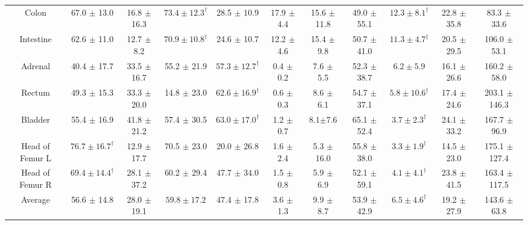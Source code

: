 \begin{table}[t!]
{\begin{subtable}{1\textwidth}
{\begin{tabular}{@{}ccccccccccc@{}}
Colon&67.0 $\pm$ 13.0&16.8 $\pm$ 16.3&$\bm{73.4\pm12.3}^\dagger$&28.5 $\pm$ 10.9&17.9 $\pm$ 4.4&15.6 $\pm$ 11.8&49.0  $\pm$  55.1&$\bm{12.3 \pm 8.1}^\dagger$&22.8 $\pm$ 35.8&83.3 $\pm$ 33.6\\
Intestine&62.6 $\pm$ 11.0&12.7 $\pm$ 8.2&$\bm{70.9\pm10.8}^\dagger$&24.6 $\pm$ 10.7&12.2 $\pm$ 4.6&15.4 $\pm$ 9.8&50.7  $\pm$  41.0& $\bm{11.3 \pm 4.7}^\dagger$ &20.5 $\pm$ 29.5&106.0 $\pm$ 53.1\\
Adrenal&40.4 $\pm$ 17.7&33.5 $\pm$ 16.7&55.2 $\pm$ 21.9&$\bm{57.3\pm12.7}^\dagger$&0.4 $\pm$ 0.2&7.6 $\pm$ 5.5&52.3  $\pm$  38.7& $\bm{6.2 \pm 5.9}$ &16.1 $\pm$ 26.6&160.2 $\pm$ 58.0\\
Rectum&49.3 $\pm$ 15.3&33.3 $\pm$ 20.0&14.8 $\pm$ 23.0&$\bm{62.6\pm16.9}^\dagger$&0.6 $\pm$ 0.3&8.6 $\pm$ 6.1&54.7  $\pm$  37.1& $\bm{5.8 \pm 10.6}^\dagger$ &17.4 $\pm$ 24.6&203.1 $\pm$ 146.3\\
Bladder&55.4 $\pm$ 16.9&41.8 $\pm$ 21.2&57.4 $\pm$ 30.5&$\bm{63.0\pm17.0}^\dagger$&1.2 $\pm$ 0.7&8.1$\pm$7.6&65.1  $\pm$  52.4& $\bm{3.7 \pm 2.3}^\dagger$ &24.1 $\pm$ 33.2&167.7 $\pm$ 96.9\\
Head of Femur L&$\bm{76.7\pm16.7}^\dagger$&12.9 $\pm$ 17.7&70.5 $\pm$ 23.0&20.0 $\pm$ 26.8&1.6 $\pm$ 2.4&5.3 $\pm$ 16.0&55.8  $\pm$  38.0& $\bm{3.3 \pm 1.9}^\dagger$&14.5 $\pm$ 23.0&175.1 $\pm$ 127.4\\
Head of Femur R&$\bm{69.4\pm14.4}^\dagger$&28.1 $\pm$ 37.2&60.2 $\pm$ 29.4&47.7 $\pm$ 34.0&1.5 $\pm$ 0.8&5.9 $\pm$ 6.9&52.1  $\pm$  59.1& $\bm{4.1 \pm 4.1}^\dagger$ &23.8 $\pm$ 41.5&163.4 $\pm$ 117.5\\ \hline
Average&56.6 $\pm$ 14.8&28.0 $\pm$ 19.1&$\bm{59.8\pm17.2}$&47.4 $\pm$ 17.8&3.6 $\pm$ 1.3&9.9 $\pm$ 8.7&53.9  $\pm$  42.9& $\bm{6.5 \pm 4.6}^\dagger$ &19.2 $\pm$ 27.9&143.6 $\pm$ 63.8 \\
\bottomrule[1.5pt]
\end{tabular}}
\end{subtable}
}
\label{tab:3}
\end{table}